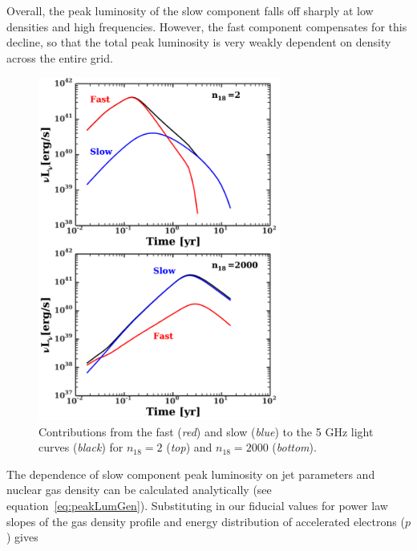 \documentclass[usenatbib,fleqn]{mnras}
\begin{document}
Overall, the peak luminosity of the slow component falls off sharply
at low densities and high frequencies. However, the fast component
compensates for this decline, so that the total peak luminosity is
very weakly dependent on density across the entire grid.

\begin{figure}
\includegraphics[width=8cm]{components.pdf}
\caption{\label{fig:components} Contributions from the fast
  (\textit{red}) and slow (\textit{blue}) to the 5 GHz light curves
  (\textit{black}) for $n_{18}=2$ (\textit{top}) and $n_{18}=2000$
  (\textit{bottom}).}
\end{figure}


The dependence of slow component peak luminosity on jet parameters and
nuclear gas density can be calculated analytically (see
equation~\ref{eq:peakLumGen}). Substituting in our fiducial values for
power law slopes of the gas density profile and energy distribution of
accelerated electrons ($p$) gives
\end{document}
